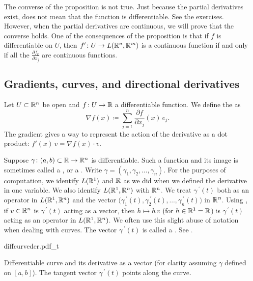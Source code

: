 The converse of the proposition is not true.  Just because the partial
derivatives exist, does not mean that the function is differentiable.  See
the exercises.
However, when the partial derivatives are continuous, we will prove that the
converse holds.
One of the consequences of the proposition is that if $f$
is differentiable on $U$, then $f' \colon U \to
L({\mathbb{R}}^n,{\mathbb{R}}^m)$ is a continuous function if and only if
all the $\frac{\partial f_k}{\partial x_j}$ are continuous functions.

\subsection{Gradients, curves, and directional derivatives}

Let $U \subset {\mathbb{R}}^n$ be open and $f \colon U \to {\mathbb{R}}$ a differentiable
function.  We define
the \emph{} as
\begin{equation*}
\nabla f (x) \coloneqq \sum_{j=1}^n \frac{\partial f}{\partial x_j} (x)\, e_j .
\end{equation*}
The gradient gives a way to represent the action of
the derivative as a dot product: $f'(x)\,v = \nabla f(x) \cdot v$.

Suppose $\gamma \colon (a,b) \subset {\mathbb{R}} \to {\mathbb{R}}^n$ is differentiable.
Such a function and its image is sometimes called a \emph{},
or a \emph{}.
Write $\gamma =
(\gamma_1,\gamma_2,\ldots,\gamma_n)$.
For the purposes of computation,
we identify $L({\mathbb{R}}^1)$ and ${\mathbb{R}}$ as we did when we defined the
derivative in one variable.
We also identify $L({\mathbb{R}}^1,{\mathbb{R}}^n)$ with ${\mathbb{R}}^n$.
We treat $\gamma^{\:\prime}(t)$ both as an operator in
$L({\mathbb{R}}^1,{\mathbb{R}}^n)$ and the vector
$\bigl(\gamma_1^{\:\prime}(t),
\gamma_2^{\:\prime}(t),\ldots,\gamma_n^{\:\prime}(t)\bigr)$
in ${\mathbb{R}}^n$.
Using ,
if $v\in {\mathbb{R}}^n$ is $\gamma^{\:\prime}(t)$ acting as a vector,
then $h \mapsto h \, v$ (for $h \in {\mathbb{R}}^1 = {\mathbb{R}}$) is
$\gamma^{\:\prime}(t)$ acting as an operator
in $L({\mathbb{R}}^1,{\mathbb{R}}^n)$.
We often use this 
slight abuse of notation when dealing with curves.
The vector $\gamma^{\:\prime}(t)$ is called a \emph{}.
See .
\begin{myfigureht}
{diffcurveder.pdf_t}
\caption{Differentiable curve and its derivative as a
vector (for clarity assuming $\gamma$ defined on $[a,b]$).
The tangent vector $\gamma^{\:\prime}(t)$ points along the curve.\label{fig:difcurveder}}
\end{myfigureht}

